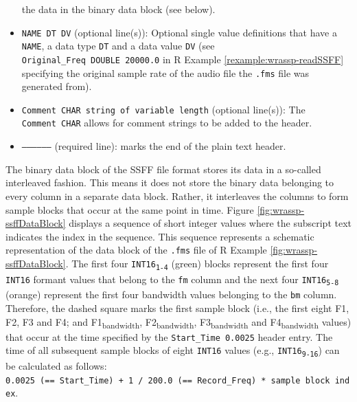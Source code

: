 \documentclass[]{book}
\theoremstyle{definition}
\theoremstyle{definition}
\theoremstyle{definition}
\theoremstyle{remark}
\begin{document}
\begin{itemize}
  the data in the binary data block (see below).
\item
  \texttt{NAME\ DT\ DV} (optional line(s)): Optional single value
  definitions that have a \texttt{NAME}, a data type \texttt{DT} and a
  data value \texttt{DV} (see \texttt{Original\_Freq\ DOUBLE\ 20000.0}
  in R Example \ref{rexample:wrassp-readSSFF} specifying the original
  sample rate of the audio file the \texttt{.fms} file was generated
  from).
\item
  \texttt{Comment\ CHAR\ string\ of\ variable\ length} (optional
  line(s)): The \texttt{Comment\ CHAR} allows for comment strings to be
  added to the header.
\item
  \texttt{—————–} (required line): marks the end of the plain text
  header.
\end{itemize}

The binary data block of the SSFF file format stores its data in a
so-called interleaved fashion. This means it does not store the binary
data belonging to every column in a separate data block. Rather, it
interleaves the columns to form sample blocks that occur at the same
point in time. Figure \ref{fig:wrassp-ssffDataBlock} displays a sequence
of short integer values where the subscript text indicates the index in
the sequence. This sequence represents a schematic representation of the
data block of the \texttt{.fms} file of R Example
\ref{fig:wrassp-ssffDataBlock}. The first four
{\texttt{INT16}\textsubscript{\texttt{1-4}}} (green) blocks represent
the first four \texttt{INT16} formant values that belong to the
\texttt{fm} column and the next four
{\texttt{INT16}\textsubscript{\texttt{5-8}}} (orange) represent the
first four bandwidth values belonging to the \texttt{bm} column.
Therefore, the dashed square marks the first sample block (i.e., the
first eight F1, F2, F3 and F4; and F1\textsubscript{bandwidth},
F2\textsubscript{bandwidth}, F3\textsubscript{bandwidth} and
F4\textsubscript{bandwidth} values) that occur at the time specified by
the \texttt{Start\_Time\ 0.0025} header entry. The time of all
subsequent sample blocks of eight \texttt{INT16} values (e.g.,
\texttt{INT16}\textsubscript{\texttt{9-16}}) can be calculated as
follows:
\texttt{0.0025\ (==\ Start\_Time)\ +\ 1\ /\ 200.0\ (==\ Record\_Freq)\ *\ sample\ block\ index}.
\end{document}
